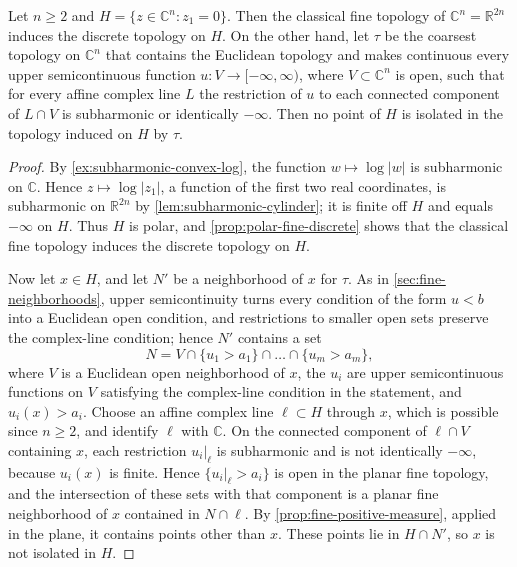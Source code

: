 \begin{proposition}\label{prop:classical-plurifine-distinction}
Let $n\geq2$ and $H=\{z\in\mathbb C^n:z_1=0\}$. Then the classical fine topology of $\mathbb C^n=\mathbb R^{2n}$ induces the discrete topology on $H$. On the other hand, let $\tau$ be the coarsest topology on $\mathbb C^n$ that contains the Euclidean topology and makes continuous every upper semicontinuous function $u\colon V\to[-\infty,\infty)$, where $V\subset\mathbb C^n$ is open, such that for every affine complex line $L$ the restriction of $u$ to each connected component of $L\cap V$ is subharmonic or identically $-\infty$. Then no point of $H$ is isolated in the topology induced on $H$ by $\tau$.
\end{proposition}
\begin{proof}
By \cref{ex:subharmonic-convex-log}, the function $w\mapsto\log|w|$ is subharmonic on $\mathbb C$. Hence $z\mapsto\log|z_1|$, a function of the first two real coordinates, is subharmonic on $\mathbb R^{2n}$ by \cref{lem:subharmonic-cylinder}; it is finite off $H$ and equals $-\infty$ on $H$. Thus $H$ is polar, and \cref{prop:polar-fine-discrete} shows that the classical fine topology induces the discrete topology on $H$.

Now let $x\in H$, and let $N'$ be a neighborhood of $x$ for $\tau$. As in \cref{sec:fine-neighborhoods}, upper semicontinuity turns every condition of the form $u<b$ into a Euclidean open condition, and restrictions to smaller open sets preserve the complex-line condition; hence $N'$ contains a set
\[
 N=V\cap\{u_1>a_1\}\cap\dots\cap\{u_m>a_m\},
\]
where $V$ is a Euclidean open neighborhood of $x$, the $u_i$ are upper semicontinuous functions on $V$ satisfying the complex-line condition in the statement, and $u_i(x)>a_i$. Choose an affine complex line $\ell\subset H$ through $x$, which is possible since $n\geq2$, and identify $\ell$ with $\mathbb C$. On the connected component of $\ell\cap V$ containing $x$, each restriction $u_i|_\ell$ is subharmonic and is not identically $-\infty$, because $u_i(x)$ is finite. Hence $\{u_i|_\ell>a_i\}$ is open in the planar fine topology, and the intersection of these sets with that component is a planar fine neighborhood of $x$ contained in $N\cap\ell$. By \cref{prop:fine-positive-measure}, applied in the plane, it contains points other than $x$. These points lie in $H\cap N'$, so $x$ is not isolated in $H$.
\end{proof}
